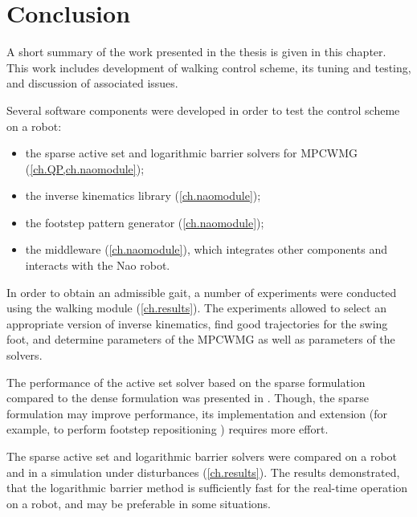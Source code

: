 \chapter{Conclusion}
\label{ch.conclusion}
A short summary of the work presented in the thesis is given in this chapter. This
work includes development of walking control scheme, its tuning and testing, and 
discussion of associated issues.

Several software components were developed in order to test the control scheme on a
robot:
\begin{itemize}
    \item the sparse active set and logarithmic barrier solvers for \ac{MPCWMG}
        (\cref{ch.QP,ch.naomodule}); 
    \item the inverse kinematics library (\cref{ch.naomodule});
    \item the footstep pattern generator (\cref{ch.naomodule});
    \item the middleware (\cref{ch.naomodule}), which integrates other components 
        and interacts with the Nao robot.
\end{itemize}

In order to obtain an admissible gait, a number of experiments were conducted using
the walking module (\cref{ch.results}). The experiments allowed to select an appropriate 
version of inverse kinematics, find good trajectories for the swing foot, and determine
parameters of the \ac{MPCWMG} as well as parameters of the solvers. 

The performance of the active set solver based on the sparse formulation compared 
to the dense formulation was presented in \cite{dimitrov2011sparse}. Though, the 
sparse formulation may improve performance, its implementation and extension (for 
example, to perform footstep repositioning \cite{dimitrov2011walking}) requires 
more effort.

The sparse active set and logarithmic barrier solvers were compared on a robot and 
in a simulation under disturbances (\cref{ch.results}). The results demonstrated, 
that the logarithmic barrier method is sufficiently fast for the real-time operation 
on a robot, and may be preferable in some situations.

